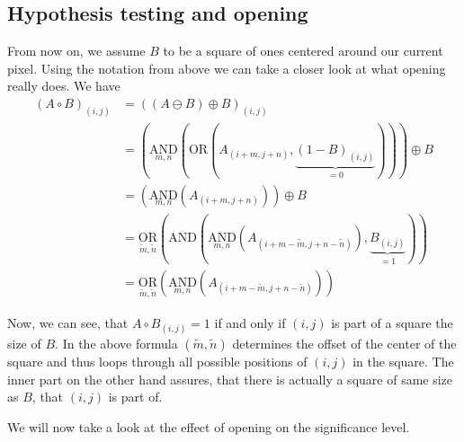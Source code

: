 \documentclass[a4paper,12pt]{article}
\theoremstyle{plain}
\theoremstyle{definition}
\theoremstyle{remark}
\begin{document}
\subsection{Hypothesis testing and opening}

From now on, we assume $B$ to be a square of ones centered around our current pixel. Using the notation from above we can take a closer look at what opening really does. We have
\begin{align*}
	(A \circ B)_{(i, j)} &= ((A \ominus B) \oplus B)_{(i, j)} \\
	&= \left( \underset{m, n}{\mathrm{AND}} \left( \mathrm{OR} (A_{(i + m, j + n)}, \underbrace{(1 - B)_{(i, j)}}_{= 0} ) \right) \right) \oplus B \\
	&= \left( \underset{m, n}{\mathrm{AND}} ( A_{(i + m, j + n)} ) \right) \oplus B \\
	&= \underset{\tilde{m}, \tilde{n}}{\mathrm{OR}} \left( \mathrm{AND} \left( \underset{m, n}{\mathrm{AND}} ( A_{(i + m - \tilde{m}, j + n - \tilde{n})} ), \underbrace{B_{(i, j)}}_{= 1} \right) \right) \\
	&= \underset{\tilde{m}, \tilde{n}}{\mathrm{OR}} \left( \underset{m, n}{\mathrm{AND}} ( A_{(i + m - \tilde{m}, j + n - \tilde{n})} ) \right)
\end{align*}

Now, we can see, that $A \circ B_{(i, j)} = 1$ if and only if $(i, j)$ is part of a square the size of $B$. In the above formula $(\tilde{m}, \tilde{n})$ determines the offset of the center of the square and thus loops through all possible positions of $(i, j)$ in the square. The inner part on the other hand assures, that there is actually a square of same size as $B$, that $(i, j)$ is part of.

We will now take a look at the effect of opening on the significance level.
\end{document}
